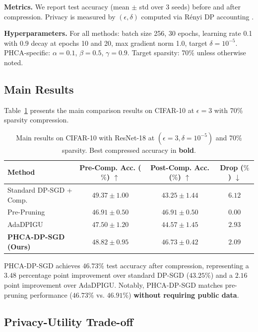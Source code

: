 \documentclass[11pt,a4paper]{article}
\begin{document}
\textbf{Metrics.} We report test accuracy (mean $\pm$ std over 3 seeds) before and after compression. Privacy is measured by $(\epsilon, \delta)$ computed via R\'{e}nyi DP accounting \citep{mironov2017renyi}.

\textbf{Hyperparameters.} For all methods: batch size 256, 30 epochs, learning rate 0.1 with 0.9 decay at epochs 10 and 20, max gradient norm 1.0, target $\delta = 10^{-5}$. PHCA-specific: $\alpha=0.1$, $\beta=0.5$, $\gamma=0.9$. Target sparsity: 70\% unless otherwise noted.

\subsection{Main Results}

Table~\ref{tab:main} presents the main comparison results on CIFAR-10 at $\epsilon=3$ with 70\% sparsity compression.

\begin{table}[t]
\caption{Main results on CIFAR-10 with ResNet-18 at $(\epsilon=3, \delta=10^{-5})$ and 70\% sparsity. Best compressed accuracy in \textbf{bold}.}
\label{tab:main}
\centering
\begin{tabular}{lccc}
\toprule
Method & Pre-Comp. Acc. ($\%$) $\uparrow$ & Post-Comp. Acc. ($\%$) $\uparrow$ & Drop ($\%$) $\downarrow$ \\
\midrule
Standard DP-SGD + Comp. & $49.37 \pm 1.00$ & $43.25 \pm 1.44$ & $6.12$ \\
Pre-Pruning \citep{adamczewski2023prepruning} & $46.91 \pm 0.50$ & $46.91 \pm 0.50$ & $0.00$ \\
AdaDPIGU \citep{zhang2025adadpigu} & $47.50 \pm 1.20$ & $44.57 \pm 1.45$ & $2.93$ \\
\textbf{PHCA-DP-SGD (Ours)} & $48.82 \pm 0.95$ & $\mathbf{46.73 \pm 0.42}$ & $\mathbf{2.09}$ \\
\bottomrule
\end{tabular}
\end{table}

PHCA-DP-SGD achieves $46.73\%$ test accuracy after compression, representing a $3.48$ percentage point improvement over standard DP-SGD ($43.25\%$) and a $2.16$ point improvement over AdaDPIGU. Notably, PHCA-DP-SGD matches pre-pruning performance ($46.73\%$ vs. $46.91\%$) \textbf{without requiring public data}.

\subsection{Privacy-Utility Trade-off}
\end{document}
